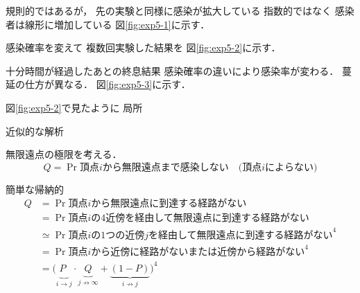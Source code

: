 \documentclass[10pt,oneside]{scrartcl}
\begin{document}
規則的ではあるが，
先の実験と同様に感染が拡大している
指数的ではなく
感染者は線形に増加している
図\ref{fig:exp5-1}に示す．

\begin{figure}[htbp]
  \centering
  \setcounter{GraphPage}{15}
  \setcounter{GraphPage}{30}
  \setcounter{GraphPage}{45}
  \setcounter{GraphPage}{60}
\end{figure}

感染確率を変えて
複数回実験した結果を
図\ref{fig:exp5-2}に示す．

\begin{figure}[htbp]
  \centering
\end{figure}

十分時間が経過したあとの終息結果
感染確率の違いにより感染率が変わる．
蔓延の仕方が異なる．
図\ref{fig:exp5-3}に示す．

図\ref{fig:exp5-2}で見たように
局所

\begin{figure*}%
  \centering
\end{figure*}


近似的な解析

無限遠点の極限を考える．
\begin{equation}
  Q
  =\Pr{\text{頂点$i$から無限遠点まで感染しない}}
  \quad\text{(頂点$i$によらない)}
\end{equation}

簡単な帰納的
\begin{align}
  Q
  &=\Pr{\text{頂点$i$から無限遠点に到達する経路がない}}\\
  &=\Pr{\text{頂点$i$の4近傍を経由して無限遠点に到達する経路がない}}\\
  &\simeq\Pr{\text{頂点$i$の1つの近傍$j$を経由して無限遠点に到達する経路がない}}^{4}\\
  &=\Pr{\text{頂点$i$から近傍に経路がない}\text{または}
    \text{近傍から経路がない}}^{4}\\
  &=\bigl(
    \underbrace{P_{\phantom{j}}}_{i\to j}
    \cdot\underbrace{Q}_{j\not\to\infty}+
    \underbrace{(1-P)}_{i\not\to j}
    \bigr)^{4}
\end{align}
\end{document}
